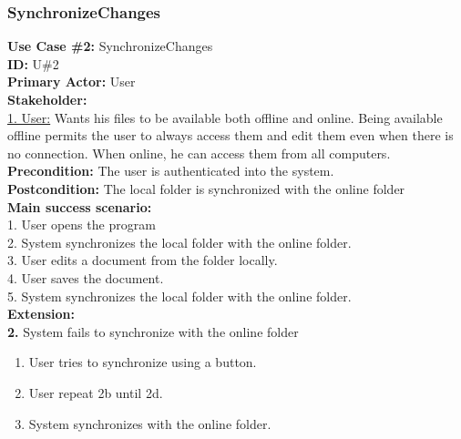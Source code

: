 \subsubsection{SynchronizeChanges}
\textbf{Use Case \#2:} SynchronizeChanges\\
\textbf{ID:} U\#2\\
\textbf{Primary Actor:} User \\
\textbf{Stakeholder:}\\
\underline{1. User:} Wants his files to be available both offline and online. Being available offline permits the user to always access them and edit them even when there is no connection. When online, he can access them from all computers.\\
\newline
\textbf{Precondition:} The user is authenticated into the system.\\
\textbf{Postcondition:} The local folder is synchronized with the online folder\\
\newline
\textbf{Main success scenario:}\\
1. User opens the program\\
2. System synchronizes the local folder with the online folder.\\
3. User edits a document from the folder locally.\\
4. User saves the document.\\
5. System synchronizes the local folder with the online folder.\\
\newline
\textbf{Extension:}\\
\textbf{2.} System fails to synchronize with the online folder
\begin{enumerate}
\item User tries to synchronize using a button.
\item User repeat 2b until 2d.
\item System synchronizes with the online folder.
\end{enumerate}

